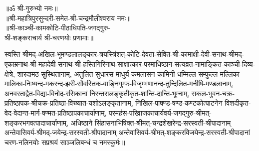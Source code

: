 \begin{center}
{॥ॐ श्री-गुरुभ्यो नमः॥}\\
{॥श्री-महात्रिपुरसुन्दरी-समेत-श्री-चन्द्रमौलीश्वराय नमः॥}\\
{॥श्री-काञ्ची-कामकोटि-पीठाधिपति-जगद्गुरु-\\ श्री-शङ्कराचार्य श्री-चरणयोः प्रणामाः॥}
\end{center}

\noindent स्वस्ति श्रीमद्-अखिल-भूमण्डलालङ्कार-त्रयस्त्रिंशत्-कोटि-देवता-सेवित-श्री-कामाक्षी-देवी-सनाथ-श्रीमद्-एकाम्रनाथ-श्री-महादेवी-सनाथ-श्री-हस्तिगिरिनाथ-साक्षात्कार-परमाधिष्ठान-सत्यव्रत-नामाङ्कित-काञ्ची-दिव्य-क्षेत्रे, शारदामठ-सुस्थितानाम्,
अतुलित-सुधारस-माधुर्य-कमलासन-कामिनी-धम्मिल्ल-सम्फुल्ल-मल्लिका-मालिका-निःष्यन्द-मकरन्द-झरी-सौवस्तिक-वाङ्निगुम्फ-विजृम्भणानन्द-तुन्दिलित-मनीषि-मण्डलानाम्,
अनवरताद्वैत-विद्या-विनोद-रसिकानां निरन्तरालङ्कृतीकृत-शान्ति-दान्ति-भूम्नाम्,
सकल-भुवन-चक्र-प्रतिष्ठापक-श्रीचक्र-प्रतिष्ठा-विख्यात-यशोऽलङ्कृतानाम्,
निखिल-पाषण्ड-षण्ड-कण्टकोत्पाटनेन विशदीकृत-वेद-वेदान्त-मार्ग-षण्मत-प्रतिष्ठापकाचार्याणाम्,
परमहंस-परिव्राजकाचार्यवर्य-जगद्गुरु-श्रीमत्-शङ्कर\-भगवत्पादा\-चार्याणाम्,
अधिष्ठाने सिंहासनाभिषिक्त-श्रीमत्-चन्द्रशेखरेन्द्र-सरस्वती-श्रीपादानाम् अन्तेवासिवर्य-श्रीमद्-जयेन्द्र-सरस्वती-श्रीपादानाम् अन्तेवासिवर्य-श्रीमत्-शङ्करविजयेन्द्र-सरस्वती-श्रीपादानां चरण-नलिनयोः सप्रश्रयं साञ्जलिबन्धं च नमस्कुर्मः॥